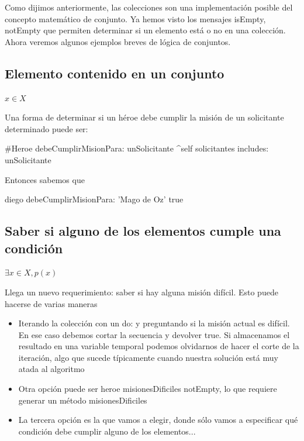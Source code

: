 \documentclass[a4paper,12pt]{book}
\begin{document}
Como dijimos anteriormente, las colecciones son una implementación posible del concepto matemático de conjunto.
Ya hemos visto los mensajes isEmpty, notEmpty que permiten determinar si un elemento está o no en una colección.
Ahora veremos algunos ejemplos breves de lógica de conjuntos.

\subsection{Elemento contenido en un conjunto}

\begin{mdframed}[style=BoxFrame]
\( x \in X \)
\end{mdframed}
 
Una forma de determinar si un héroe debe cumplir la misión de un solicitante determinado puede ser:

\begin{code}
#Heroe
debeCumplirMisionPara: unSolicitante
    ^self solicitantes includes: unSolicitante
\end{code}

Entonces sabemos que

\begin{code}
diego debeCumplirMisionPara: 'Mago de Oz'
    true
\end{code}

\subsection{Saber si alguno de los elementos cumple una condición}

\begin{mdframed}[style=BoxFrame]
\( \exists x \in X, p(x) \)
\end{mdframed}

Llega un nuevo requerimiento: saber si hay alguna misión difícil. Esto puede hacerse de varias maneras

\begin{itemize}
 \item Iterando la colección con un do: y preguntando si la misión actual es difícil. En ese caso debemos
 cortar la secuencia y devolver true. Si almacenamos el resultado en una variable temporal podemos olvidarnos
 de hacer el corte de la iteración, algo que sucede típicamente cuando nuestra solución está muy atada al algoritmo
 \item Otra opción puede ser heroe misionesDificiles notEmpty, lo que requiere generar
 un método misionesDificiles
 \item La tercera opción es la que vamos a elegir, donde sólo vamos a especificar qué condición debe cumplir alguno
 de los elementos...
\end{itemize}
\end{document}
